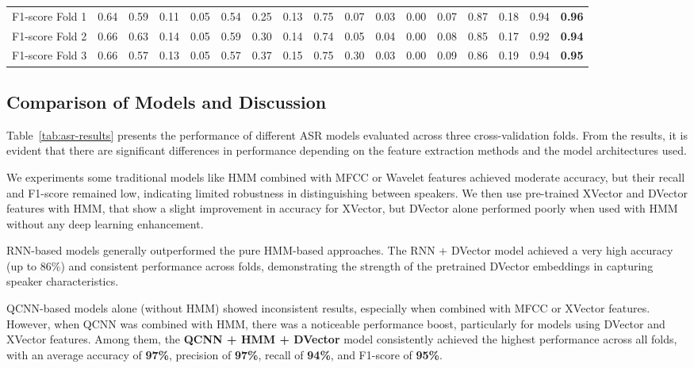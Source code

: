 \documentclass[conference]{IEEEtran}
\begin{document}
\begin{table*}[htbp]
{\begin{tabular}{|l|c|c|c|c|c|c|c|c|c|c|c|c|c|c|c|c|}
        \hline
        F1-score Fold 1 & 0.64 & 0.59 & 0.11 & 0.05 & 0.54 & 0.25 & 0.13 & 0.75 & 0.07 & 0.03 & 0.00 & 0.07 & 0.87 & 0.18 & 0.94 & \textbf{0.96} \\
        F1-score Fold 2 & 0.66 & 0.63 & 0.14 & 0.05 & 0.59 & 0.30 & 0.14 & 0.74 & 0.05 & 0.04 & 0.00 & 0.08 & 0.85 & 0.17 & 0.92 & \textbf{0.94} \\
        F1-score Fold 3 & 0.66 & 0.57 & 0.13 & 0.05 & 0.57 & 0.37 & 0.15 & 0.75 & 0.30 & 0.03 & 0.00 & 0.09 & 0.86 & 0.19 & 0.94 & \textbf{0.95} \\
        \hline
    \end{tabular}
    }
\end{table*}
\subsection{Comparison of Models and Discussion}

Table~\ref{tab:asr-results} presents the performance of different ASR models evaluated across three cross-validation folds. From the results, it is evident that there are significant differences in performance depending on the feature extraction methods and the model architectures used.

We experiments some traditional models like HMM combined with MFCC or Wavelet features achieved moderate accuracy, but their recall and F1-score remained low, indicating limited robustness in distinguishing between speakers. We then use pre-trained XVector and DVector features with HMM, that show a slight improvement in accuracy for XVector, but DVector alone performed poorly when used with HMM without any deep learning enhancement.

RNN-based models generally outperformed the pure HMM-based approaches. The RNN + DVector model achieved a very high accuracy (up to 86\%) and consistent performance across folds, demonstrating the strength of the pretrained DVector embeddings in capturing speaker characteristics.

QCNN-based models alone (without HMM) showed inconsistent results, especially when combined with MFCC or XVector features. However, when QCNN was combined with HMM, there was a noticeable performance boost, particularly for models using DVector and XVector features. Among them, the \textbf{QCNN + HMM + DVector} model consistently achieved the highest performance across all folds, with an average accuracy of \textbf{97\%}, precision of \textbf{97\%}, recall of \textbf{94\%}, and F1-score of \textbf{95\%}.
\end{document}
